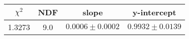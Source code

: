 \begin{tabular}{|c|c|c|c|}

\hline
$\chi^{2}$ & NDF & slope & y-intercept  \\
\hline
1.3273 & 9.0 & $0.0006\pm0.0002$ & $0.9932\pm0.0139$ \\
\hline

\end{tabular}
